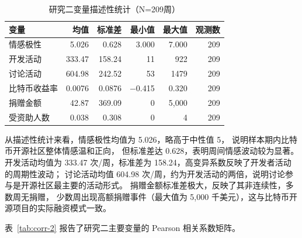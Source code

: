 \documentclass[
    type = master, %
    degree = professional,        %
    decl-page,  %
    twoside,                %
    fontset = fandol %
  ]{njuthesis}
\begin{document}
\begin{table}[htbp]
    \centering
    \small
    \caption{研究二变量描述性统计（N=209周）}
    \label{tab:desc-stats-2}
    \begin{tabularx}{\textwidth}{Xrrrrr}
        \toprule
        变量 & 均值 & 标准差 & 最小值 & 最大值 & 观测数 \\
        \midrule
        情感极性 & 5.026 & 0.628 & 3.000 & 7.000 & 209 \\
        开发活动      & 333.47 & 158.24 & 11 & 922 & 209 \\
        讨论活动   & 604.98 & 242.52 & 53 & 1479 & 209 \\
        比特币收益率    & 0.0076 & 0.0876 & $-$0.415 & 0.320 & 209 \\
        捐赠金额  & 42.87 & 369.09 & 0 & 5{,}000 & 209 \\
        受资助人数     & 0.038 & 0.308 & 0 & 4 & 209 \\
        \bottomrule
    \end{tabularx}
\end{table}

从描述性统计来看，情感极性均值为 5.026，略高于中性值 5，
说明样本期内比特币开源社区整体情感温和正向，
但标准差达 0.628，表明周间情感波动较为显著。
开发活动均值为 333.47 次/周，标准差为 158.24，高变异系数反映了开发者活动的周期性波动；
讨论活动均值 604.98 次/周，约为开发活动的两倍，说明讨论参与是开源社区最主要的活动形式。
捐赠金额标准差极大，反映了其非连续性，多数周无捐赠，
少数周出现高额捐赠事件（最大值为 5,000 千美元），这与比特币开源项目的实际融资模式一致。

表~\ref{tab:corr-2} 报告了研究二主要变量的 Pearson 相关系数矩阵。
\end{document}

